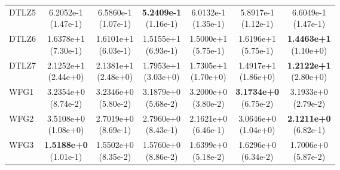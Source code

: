 \begin{table}[p]
\begin{tabular}{lcccccc}
DTLZ5 & \shortstack{6.2052e-1\\(1.47e-1)} & \shortstack{6.5860e-1\\(1.07e-1)} & \shortstack{\textbf{5.2409e-1}\\(1.16e-1)} & \shortstack{6.0132e-1\\(1.35e-1)} & \shortstack{5.8917e-1\\(1.12e-1)} & \shortstack{6.6049e-1\\(1.47e-1)} \\
DTLZ6 & \shortstack{1.6378e+1\\(7.30e-1)} & \shortstack{1.6101e+1\\(6.03e-1)} & \shortstack{1.5155e+1\\(6.93e-1)} & \shortstack{1.5000e+1\\(5.75e-1)} & \shortstack{1.6196e+1\\(5.75e-1)} & \shortstack{\textbf{1.4463e+1}\\(1.10e+0)} \\
DTLZ7 & \shortstack{2.1252e+1\\(2.44e+0)} & \shortstack{2.1381e+1\\(2.48e+0)} & \shortstack{1.7953e+1\\(3.03e+0)} & \shortstack{1.7305e+1\\(1.70e+0)} & \shortstack{1.4917e+1\\(1.86e+0)} & \shortstack{\textbf{1.2122e+1}\\(2.80e+0)} \\
WFG1 & \shortstack{3.2354e+0\\(8.74e-2)} & \shortstack{3.2346e+0\\(5.80e-2)} & \shortstack{3.1879e+0\\(5.68e-2)} & \shortstack{3.2000e+0\\(3.80e-2)} & \shortstack{\textbf{3.1734e+0}\\(6.75e-2)} & \shortstack{3.1933e+0\\(2.79e-2)} \\
WFG2 & \shortstack{3.5108e+0\\(1.08e+0)} & \shortstack{2.7019e+0\\(8.69e-1)} & \shortstack{2.7960e+0\\(8.43e-1)} & \shortstack{2.1621e+0\\(6.46e-1)} & \shortstack{3.0646e+0\\(1.04e+0)} & \shortstack{\textbf{2.1211e+0}\\(6.82e-1)} \\
WFG3 & \shortstack{\textbf{1.5188e+0}\\(1.01e-1)} & \shortstack{1.5502e+0\\(8.35e-2)} & \shortstack{1.5760e+0\\(8.86e-2)} & \shortstack{1.6399e+0\\(5.18e-2)} & \shortstack{1.6296e+0\\(6.34e-2)} & \shortstack{1.7006e+0\\(5.87e-2)} \\

\end{tabular}
\end{table}
